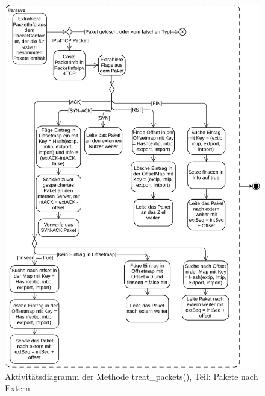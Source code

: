 \documentclass[../review_2.tex]{subfiles}
\begin{document}
\begin{figure}[h]
	\centering
	\includegraphics[width=0.96\linewidth]{img/treat_packets_1.pdf}
	\caption{Aktivitätsdiagramm der Methode treat\_packets(), Teil: Pakete nach Extern}
	\label{Aktivität_treat_packet_1}
\end{figure}
\end{document}
